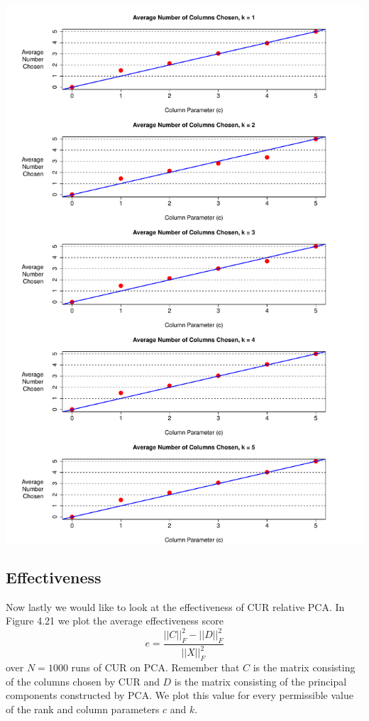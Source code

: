 \documentclass{book}
\begin{document}
\newpage
\begin{center}
\includegraphics[scale=.6]{./Figures/cs_ex_1/chosen.pdf}
\end{center}



\subsection{Effectiveness}

Now lastly we would like to look at the effectiveness of CUR relative PCA. In Figure 4.21 we plot the average effectiveness score 
$$
e=\frac{||C||_F^2-||D||_F^2}{||X||_F^2}
$$
over $N=1000$ runs of CUR on PCA. Remember that $C$ is the matrix consisting of the columns chosen by CUR and $D$ is the matrix consisting of the principal components constructed by PCA. We plot this value for every permissible value of the rank and column parameters $c$ and $k$. 
\end{document}
